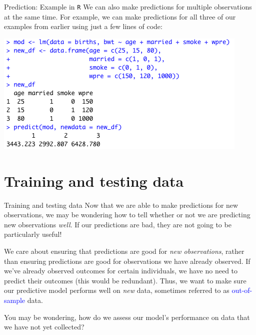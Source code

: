 \documentclass[10pt,t]{beamer}
\begin{document}
\begin{frame}{Prediction: Example in \texttt{R}}
We can also make predictions for multiple observations at the same time. For example, we can make predictions for all three of our examples from earlier using just a few lines of code:

\vspace{0.3cm}

\centering \includegraphics[scale=0.5]{newdata_example2.png}

\end{frame}


\section{Training and testing data}

\begin{frame}{Training and testing data}
Now that we are able to make predictions for new observations, we may be wondering how to tell whether or not we are predicting new observations \textit{well}. If our predictions are bad, they are not going to be particularly useful!

\vspace{0.3cm}

We care about ensuring that predictions are good for \textit{new observations}, rather than ensuring predictions are good for observations we have already observed. If we've already observed outcomes for certain individuals, we have no need to predict their outcomes (this would be redundant). Thus, we want to make sure our predictive model performs well on \textit{new} data, sometimes referred to as \textcolor{blue}{out-of-sample} data.

\vspace{0.3cm}

You may be wondering, how do we assess our model's performance on data that we have not yet collected?
\end{frame}
\end{document}
